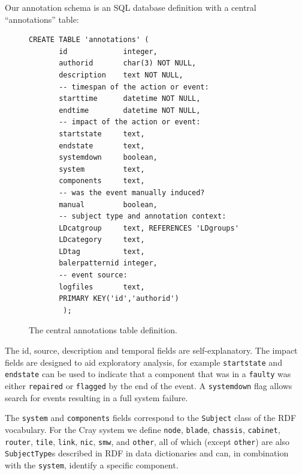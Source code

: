 Our annotation schema is an SQL database definition with a central 
``annotations'' table:

\begin{figure}[H]
\begin{small}
\begin{verbatim}
CREATE TABLE 'annotations' (
       id             integer,
       authorid       char(3) NOT NULL,
       description    text NOT NULL,
       -- timespan of the action or event:
       starttime      datetime NOT NULL,
       endtime        datetime NOT NULL,
       -- impact of the action or event:
       startstate     text,
       endstate       text,
       systemdown     boolean,
       system         text,
       components     text,
       -- was the event manually induced?
       manual         boolean,
       -- subject type and annotation context:
       LDcatgroup     text, REFERENCES 'LDgroups'
       LDcategory     text,
       LDtag          text,
       balerpatternid integer,
       -- event source:
       logfiles       text,
       PRIMARY KEY('id','authorid')
        );
\end{verbatim}
\end{small}
\caption{The central annotations table definition. }
\label{f:ann-table}
\end{figure}

The id, source, description and temporal fields are self-explanatory. 
The impact fields are designed to aid exploratory analysis, for example
\texttt{startstate} and \texttt{endstate} can be used to indicate that
a component that was in a \texttt{faulty} was either \texttt{repaired}
or \texttt{flagged} by the end of the event. A \texttt{systemdown} flag
allows search for events resulting in a full system failure.

The \texttt{system} and \texttt{components} fields correspond to the 
\texttt{Subject} class of the RDF vocabulary.
For the Cray system we define \texttt{node}, \texttt{blade}, \texttt{chassis},
\texttt{cabinet}, \texttt{router}, \texttt{tile}, \texttt{link}, \texttt{nic},
\texttt{smw}, and \texttt{other}, all of which (except \texttt{other}) are 
also \texttt{SubjectType}s described in RDF in data dictionaries and can, in
combination with the \texttt{system}, identify a specific component.

